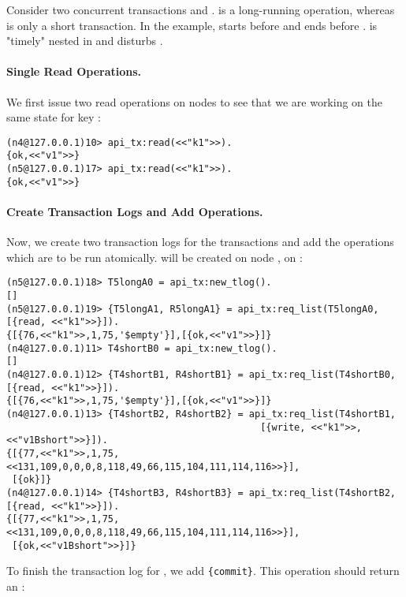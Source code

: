 Consider two concurrent transactions  and .  is a
long-running operation, whereas  is only a short transaction.  In
the example,  starts before  and  ends before
.  is "timely" nested in  and disturbs .

\paragraph{Single Read Operations.}
We first issue two read operations on nodes  to see that we are
working on the same state for key :

\begin{lstlisting}
(n4@127.0.0.1)10> api_tx:read(<<"k1">>).
{ok,<<"v1">>}
(n5@127.0.0.1)17> api_tx:read(<<"k1">>).
{ok,<<"v1">>}
\end{lstlisting}

\paragraph{Create Transaction Logs and Add Operations.}
Now, we create two transaction logs for the transactions and add the
operations which are to be run atomically.  will be created on node
,  on :
\begin{lstlisting}
(n5@127.0.0.1)18> T5longA0 = api_tx:new_tlog().
[]
(n5@127.0.0.1)19> {T5longA1, R5longA1} = api_tx:req_list(T5longA0, [{read, <<"k1">>}]).
{[{76,<<"k1">>,1,75,'$empty'}],[{ok,<<"v1">>}]}
(n4@127.0.0.1)11> T4shortB0 = api_tx:new_tlog().
[]
(n4@127.0.0.1)12> {T4shortB1, R4shortB1} = api_tx:req_list(T4shortB0, [{read, <<"k1">>}]).
{[{76,<<"k1">>,1,75,'$empty'}],[{ok,<<"v1">>}]}
(n4@127.0.0.1)13> {T4shortB2, R4shortB2} = api_tx:req_list(T4shortB1,
                                             [{write, <<"k1">>, <<"v1Bshort">>}]).
{[{77,<<"k1">>,1,75, <<131,109,0,0,0,8,118,49,66,115,104,111,114,116>>}],
 [{ok}]}
(n4@127.0.0.1)14> {T4shortB3, R4shortB3} = api_tx:req_list(T4shortB2, [{read, <<"k1">>}]).
{[{77,<<"k1">>,1,75, <<131,109,0,0,0,8,118,49,66,115,104,111,114,116>>}],
 [{ok,<<"v1Bshort">>}]}
\end{lstlisting}

To finish the transaction log for , we add
\lstinline|{commit}|. This operation should return an :

